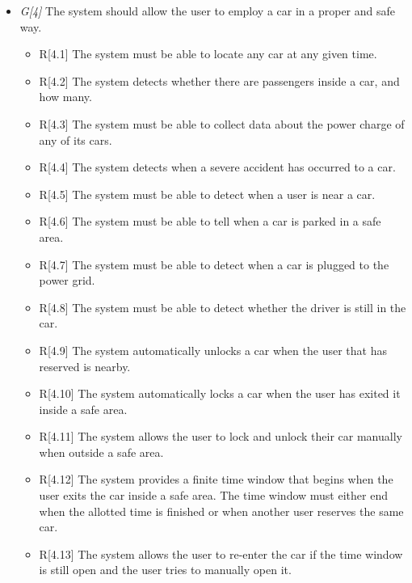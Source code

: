 \begin{itemize}
				\item \textit{G[4]} The system should allow the user to employ a car in a proper and safe way. 
					\begin{itemize}
						\item R[4.1] The system must be able to locate any car at any given time. 
						\item R[4.2] The system detects whether there are passengers inside a car, and how many.
						\item R[4.3] The system must be able to collect data about the power charge of any of its cars. %
						\item R[4.4] The system detects when a severe accident has occurred to a car.
						\item R[4.5] The system must be able to detect when a user is near a car.
						\item R[4.6] The system must be able to tell when a car is parked in a safe area.
						\item R[4.7] The system must be able to detect when a car is plugged to the power grid.
						\item R[4.8] The system must be able to detect whether the driver is still in the car.
						\item R[4.9] The system automatically unlocks a car when the user that has reserved is nearby. %
						\item R[4.10] The system automatically locks a car when the user has exited it inside a safe area. 
						\item R[4.11] The system allows the user to lock and unlock their car manually when outside a safe area.
						\item R[4.12] The system provides a finite time window that begins when the user exits the car inside a safe area. The time window must either end when the allotted time is finished or when another user reserves the same car.
						\item R[4.13] The system allows the user to re-enter the car if the time window is still open and the user tries to manually open it. 
					\end{itemize}
					

\end{itemize}
